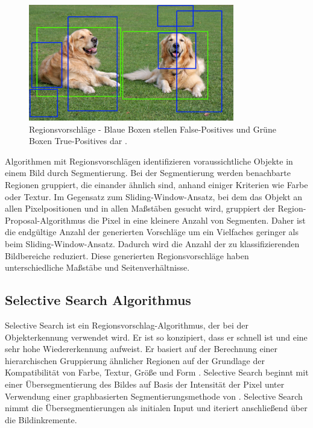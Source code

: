 \begin{figure}[htb]
	\centering
	\includegraphics[width=0.8\textwidth]{images/object-recognition-false-positives-true-positives}
	\caption[Darstellung des Region Proposal Algorithmus]{Regionsvorschläge - Blaue Boxen stellen False-Positives und Grüne Boxen True-Positives dar \cite{learnopencv}.}
\end{figure}

Algorithmen mit Regionsvorschlägen identifizieren voraussichtliche Objekte in einem Bild durch Segmentierung. Bei der Segmentierung werden benachbarte Regionen gruppiert, die einander ähnlich sind, anhand einiger Kriterien wie Farbe oder Textur. Im Gegensatz zum Sliding-Window-Ansatz, bei dem das Objekt an allen Pixelpositionen und in allen Maßstäben gesucht wird, gruppiert der Region-Proposal-Algorithmus die Pixel in eine kleinere Anzahl von Segmenten. Daher ist die endgültige Anzahl der generierten Vorschläge um ein Vielfaches geringer als beim Sliding-Window-Ansatz. Dadurch wird die Anzahl der zu klassifizierenden Bildbereiche reduziert. Diese generierten Regionsvorschläge haben unterschiedliche Maßstäbe und Seitenverhältnisse.

\subsection{Selective Search Algorithmus}

Selective Search ist ein Regionsvorschlag-Algorithmus, der bei der Objekterkennung verwendet wird. Er ist so konzipiert, dass er schnell ist und eine sehr hohe Wiedererkennung aufweist. Er basiert auf der Berechnung einer hierarchischen Gruppierung ähnlicher Regionen auf der Grundlage der Kompatibilität von Farbe, Textur, Größe und Form \cites{learnopencv}{UijlingsIJCV2013}. Selective Search beginnt mit einer Übersegmentierung des Bildes auf Basis der Intensität der Pixel unter Verwendung einer graphbasierten Segmentierungsmethode von \citeauthor{felzenszwalb1998ciently} \cite{felzenszwalb1998ciently}. Selective Search nimmt die Übersegmentierungen als initialen Input und iteriert anschließend über die Bildinkremente. 

